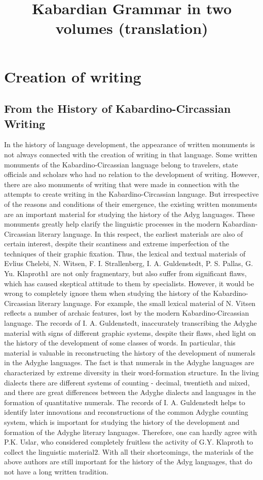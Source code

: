 \documentclass[a4paper,12pt]{book}
\title{Kabardian Grammar in two volumes (translation)}
\newcommand{\1}[1]{\textbf{\emph{#1}}} %
\newcommand{\2}[1]{\textbf{[#1]}} %
\newcommand{\3}[1]{\fontsize{11pt}{0cm}\textbf{\emph{#1}}} %
\newcommand{\4}[1]{\fontsize{10pt}{0cm}\emph{#1}}	%
\newcommand{\5}[1]{\textbf{/#1/}} %
\newcommand{\6}[1]{\textbf{[#1]}} %
\newcommand{\7}[1]{\fontsize{12pt}{0cm}\emph{#1}} %
\newcommand{\8}[1]{\fontsize{12pt}{0cm}`#1'} %
\newcommand{\9}[1]{\fontsize{12pt}{0cm}(lit. `#1')} %
\begin{document}
\chapter{Creation of writing}
\section{From the History of Kabardino-Circassian Writing}
In the history of language development, the appearance of written monuments is not always connected with the creation of writing in that language. Some written monuments of the Kabardino-Circassian language belong to travelers, state officials and scholars who had no relation to the development of writing. However, there are also monuments of writing that were made in connection with the attempts to create writing in the Kabardino-Circassian language. But irrespective of the reasons and conditions of their emergence, the existing written monuments are an important material for studying the history of the Adyg languages. These monuments greatly help clarify the linguistic processes in the modern Kabardian-Circassian literary language. In this respect, the earliest materials are also of certain interest, despite their scantiness and extreme imperfection of the techniques of their graphic fixation. Thus, the lexical and textual materials of Evlius Chelebi, N. Witsen, F. I. Strallenberg, I. A. Guldenstedt, P. S. Pallas, G. Yu. Klaproth1 are not only fragmentary, but also suffer from significant flaws, which has caused skeptical attitude to them by specialists. However, it would be wrong to completely ignore them when studying the history of the Kabardino-Circassian literary language. For example, the small lexical material of N. Vitsen reflects a number of archaic features, lost by the modern Kabardino-Circassian language. The records of I. A. Guldenstedt, inaccurately transcribing the Adyghe material with signs of different graphic systems, despite their flaws, shed light on the history of the development of some classes of words. In particular, this material is valuable in reconstructing the history of the development of numerals in the Adyghe languages. The fact is that numerals in the Adyghe languages are characterized by extreme diversity in their word-formation structure. In the living dialects there are different systems of counting - decimal, twentieth and mixed, and there are great differences between the Adyghe dialects and languages in the formation of quantitative numerals. The records of I. A. Guldenstedt helps to identify later innovations and reconstructions of the common Adyghe counting system, which is important for studying the history of the development and formation of the Adyghe literary languages. Therefore, one can hardly agree with P.K. Uslar, who considered completely fruitless the activity of G.Y. Klaproth to collect the linguistic material2. With all their shortcomings, the materials of the above authors are still important for the history of the Adyg languages, that do not have a long written tradition.\\
\end{document}

